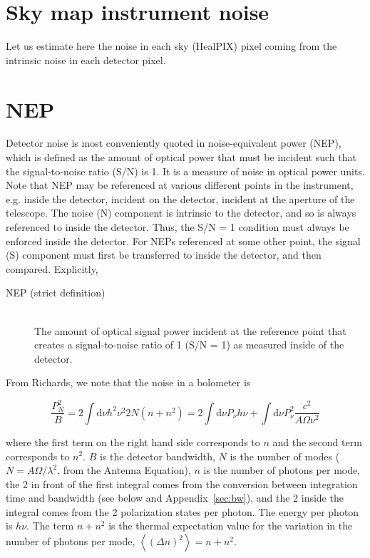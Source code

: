 \documentclass[twoside,10pt]{article}
\title{\doctitle}
\author{\myname}
\newcommand{\Avg}[1]{\left< #1 \right>}
\newcommand{\dd}[0]{\mathrm{d}}
\begin{document}
\maketitle

\section{Sky map instrument noise}
\label{sec:noise}

Let us estimate here the noise in each sky (HealPIX) pixel coming from the
intrinsic noise in each detector pixel.

\section{NEP}
\label{sec:nep}

Detector noise is most conveniently quoted in noise-equivalent power (NEP),
which is defined as the amount of optical power that must be incident such
that the signal-to-noise ratio (S/N) is 1. It is a measure of noise in optical
power units. Note that NEP may be referenced at various different points in
the instrument, e.g. inside the detector, incident on the detector, incident
at the aperture of the telescope. The noise (N) component is intrinsic to the
detector, and so is always referenced to inside the detector. Thus, the S/N =
1 condition must always be enforced inside the detector. For NEPs referenced
at some other point, the signal (S) component must first be transferred to
inside the detector, and then compared. Explicitly,

\begin{description}
    \item[NEP (strict definition)] \hfill \\
    The amount of optical signal power incident at the reference
    point that creates a signal-to-noise ratio of 1 (S/N = 1) as measured
    inside of the detector.
\end{description}

From Richards\cite{richards_bolometers_1994}, we note that the noise in a
bolometer is

\begin{equation}
    \label{eq:noisepower}
    \frac{P_N^2}{B} = 2 \int\dd\nu h^2\nu^2 2N(n + n^2) = 2 \int\dd\nu P_\nu h\nu + \int\dd\nu P_\nu^2 \frac{c^2}{A\Omega \nu^2}
\end{equation}

where the first term on the right hand side corresponds to $n$ and the second
term corresponds to $n^2$. $B$ is the detector bandwidth, $N$ is the number of
modes ($N = A\Omega/\lambda^2$, from the Antenna Equation), $n$ is the number
of photons per mode, the 2 in front of the first integral comes from the
conversion between integration time and bandwidth (see below and
Appendix~\ref{sec:bw}), and the 2 inside the integral comes from the 2
polarization states per photon. The energy per photon is $h\nu$. The term
$n + n^2$ is the thermal expectation value for the variation in the number of
photons per mode, $\Avg{(\Delta n)^2} = n + n^2$.
\end{document}
